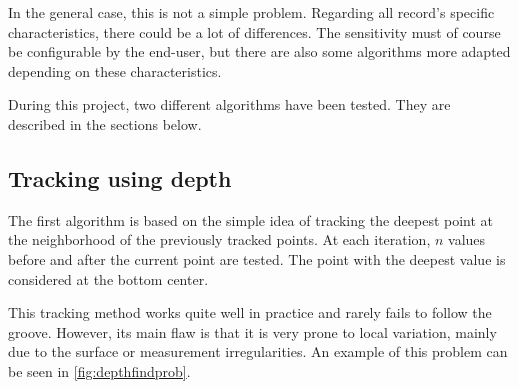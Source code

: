 In the general case, this is not a simple problem. Regarding all record's specific characteristics, there could be a lot of differences. The sensitivity must of course be configurable by the end-user, but there are also some algorithms more adapted depending on these characteristics.

During this project, two different algorithms have been tested. They are described in the sections below.

\subsection{Tracking using depth}

The first algorithm is based on the simple idea of tracking the deepest point at the neighborhood of the previously tracked points. At each iteration, $n$ values before and after the current point are tested. The point with the deepest value is considered at the bottom center.

This tracking method works quite well in practice and rarely fails to follow the groove. However, its main flaw is that it is very prone to local variation, mainly due to the surface or measurement irregularities. An example of this problem can be seen in \autoref{fig:depthfindprob}.

